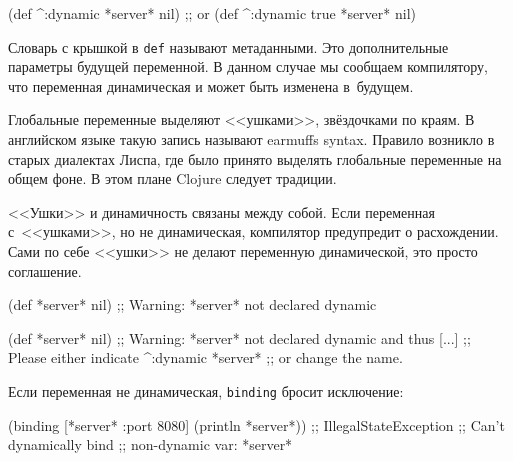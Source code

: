 \begin{english}
  \begin{clojure}
(def ^:dynamic *server* nil)
;; or
(def ^{:dynamic true} *server* nil)
  \end{clojure}
\end{english}

Словарь с крышкой в \verb|def| называют метаданными. Это дополнительные
параметры будущей переменной. В данном случае мы сообщаем компилятору, что
переменная динамическая и может быть изменена в~будущем.

Глобальные переменные выделяют <<ушками>>, звёздочками по краям. В английском
языке такую запись называют earmuffs syntax. Правило возникло в старых диалектах
Лиспа, где было принято выделять глобальные переменные на общем фоне. В этом
плане Clojure следует традиции.


<<Ушки>> и динамичность связаны между собой. Если переменная с~<<ушками>>, но не
динамическая, компилятор предупредит о расхождении. Сами по себе <<ушки>> не
делают переменную динамической, это просто соглашение.

\ifnarrow

\begin{english}
  \begin{clojure}
(def *server* nil)
;; Warning: *server* not declared dynamic
  \end{clojure}
\end{english}

\else

\begin{english}
  \begin{clojure}
(def *server* nil)
;; Warning: *server* not declared dynamic and thus [...]
;; Please either indicate ^:dynamic *server*
;; or change the name.
  \end{clojure}
\end{english}

\fi

\noindent
Если переменная не динамическая, \verb|binding| бросит исключение:

\ifnarrow

\begin{english}
  \begin{clojure}
(binding [*server* {:port 8080}]
  (println *server*))
;; IllegalStateException
;; Can't dynamically bind
;; non-dynamic var: *server*
  \end{clojure}
\end{english}

